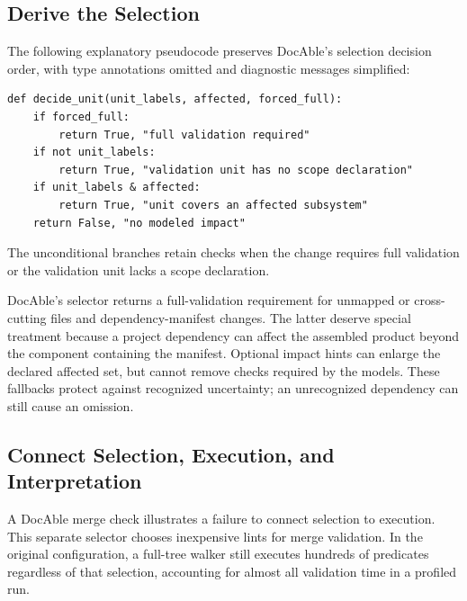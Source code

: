 \subsection*{Derive the Selection}\label{heading:derive-the-selection}

The following explanatory pseudocode preserves DocAble's selection decision order, with type annotations omitted and diagnostic messages simplified:

\begin{verbatim}
def decide_unit(unit_labels, affected, forced_full):
    if forced_full:
        return True, "full validation required"
    if not unit_labels:
        return True, "validation unit has no scope declaration"
    if unit_labels & affected:
        return True, "unit covers an affected subsystem"
    return False, "no modeled impact"
\end{verbatim}

The unconditional branches retain checks when the change requires full validation or the validation unit lacks a scope declaration.

DocAble's selector returns a full-validation requirement for unmapped or cross-cutting files and dependency-manifest changes. The latter deserve special treatment because a project dependency can affect the assembled product beyond the component containing the manifest. Optional impact hints can enlarge the declared affected set, but cannot remove checks required by the models. These fallbacks protect against recognized uncertainty; an unrecognized dependency can still cause an omission.

\subsection*{Connect Selection, Execution, and Interpretation}\label{heading:connect-selection-execution-and-interpretation}

A DocAble merge check illustrates a failure to connect selection to execution. This separate selector chooses inexpensive lints for merge validation. In the original configuration, a full-tree walker still executes hundreds of predicates regardless of that selection, accounting for almost all validation time in a profiled run.

